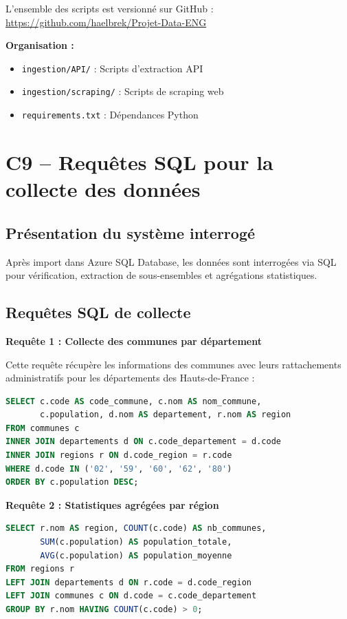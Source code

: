 \documentclass[12pt,a4paper]{article}
\begin{document}
L'ensemble des scripts est versionné sur GitHub : \url{https://github.com/haelbrek/Projet-Data-ENG}

\textbf{Organisation :}
\begin{itemize}
    \item \texttt{ingestion/API/} : Scripts d'extraction API
    \item \texttt{ingestion/scraping/} : Scripts de scraping web
    \item \texttt{requirements.txt} : Dépendances Python
\end{itemize}

\section{C9 -- Requêtes SQL pour la collecte des données}

\subsection{Présentation du système interrogé}

Après import dans Azure SQL Database, les données sont interrogées via SQL pour vérification, extraction de sous-ensembles et agrégations statistiques.

\subsection{Requêtes SQL de collecte}

\textbf{Requête 1 : Collecte des communes par département}

Cette requête récupère les informations des communes avec leurs rattachements administratifs pour les départements des Hauts-de-France :

\begin{lstlisting}[language=SQL]
SELECT c.code AS code_commune, c.nom AS nom_commune,
       c.population, d.nom AS departement, r.nom AS region
FROM communes c
INNER JOIN departements d ON c.code_departement = d.code
INNER JOIN regions r ON d.code_region = r.code
WHERE d.code IN ('02', '59', '60', '62', '80')
ORDER BY c.population DESC;
\end{lstlisting}

\textbf{Requête 2 : Statistiques agrégées par région}

\begin{lstlisting}[language=SQL]
SELECT r.nom AS region, COUNT(c.code) AS nb_communes,
       SUM(c.population) AS population_totale,
       AVG(c.population) AS population_moyenne
FROM regions r
LEFT JOIN departements d ON r.code = d.code_region
LEFT JOIN communes c ON d.code = c.code_departement
GROUP BY r.nom HAVING COUNT(c.code) > 0;
\end{lstlisting}
\end{document}
